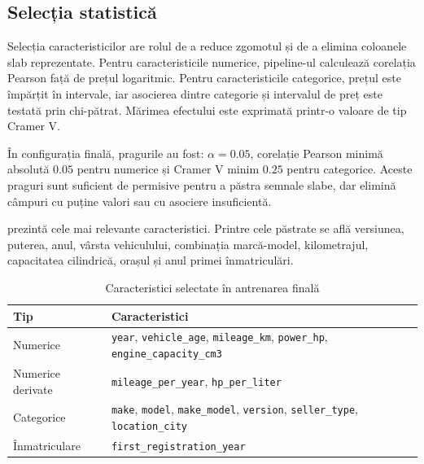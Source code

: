 \subsection{Selecția statistică}
\label{sec:models-selection}

Selecția caracteristicilor are rolul de a reduce zgomotul și de a elimina coloanele slab reprezentate. Pentru caracteristicile numerice, pipeline-ul calculează corelația Pearson față de prețul logaritmic. Pentru caracteristicile categorice, prețul este împărțit în intervale, iar asocierea dintre categorie și intervalul de preț este testată prin chi-pătrat. Mărimea efectului este exprimată printr-o valoare de tip Cramer V.

În configurația finală, pragurile au fost: \(\alpha = 0.05\), corelație Pearson minimă absolută \(0.05\) pentru numerice și Cramer V minim \(0.25\) pentru categorice. Aceste praguri sunt suficient de permisive pentru a păstra semnale slabe, dar elimină câmpuri cu puține valori sau cu asociere insuficientă.

 prezintă cele mai relevante caracteristici. Printre cele păstrate se află versiunea, puterea, anul, vârsta vehiculului, combinația marcă-model, kilometrajul, capacitatea cilindrică, orașul și anul primei înmatriculări.


\begin{table}[htb]
    \centering
    \caption{Caracteristici selectate în antrenarea finală}
    \label{tab:selected-features}
    \begin{tabular}{@{}p{3.2cm}p{9.5cm}@{}}
        \toprule
        Tip & Caracteristici \\
        \midrule
        Numerice & \texttt{year}, \texttt{vehicle\_age}, \texttt{mileage\_km}, \texttt{power\_hp}, \texttt{engine\_capacity\_cm3} \\
        Numerice derivate & \texttt{mileage\_per\_year}, \texttt{hp\_per\_liter} \\
        Categorice & \texttt{make}, \texttt{model}, \texttt{make\_model}, \texttt{version}, \texttt{seller\_type}, \texttt{location\_city} \\
        Înmatriculare & \texttt{first\_registration\_year} \\
        \bottomrule
    \end{tabular}
\end{table}

